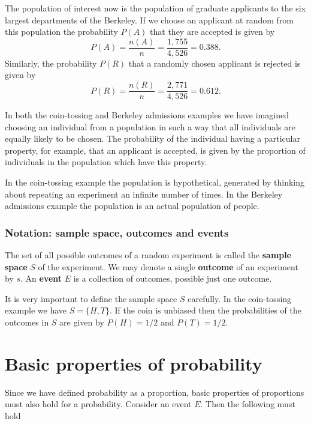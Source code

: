 \documentclass[
  british,
]{book}
\begin{document}
\FloatBarrier

The population of interest now is the population of graduate applicants to the six largest departments of the Berkeley. If we choose an applicant at random from this population the probability \(P(A)\) that they are accepted is given by
\[ P(A) = \frac{n(A)}{n} = \frac{1,755}{4,526} = 0.388.\]
Similarly, the probability \(P(R)\) that a randomly chosen applicant is rejected is given by
\[ P(R) = \frac{n(R)}{n} = \frac{2,771}{4,526} = 0.612.\]

In both the coin-tossing and Berkeley admissions examples we have imagined choosing an individual from a population in such a way that all individuals are equally likely to be chosen. The probability of the individual having a particular property, for example, that an applicant is accepted, is given by the proportion of individuals in the population which have this property.

In the coin-tossing example the population is hypothetical, generated by thinking about repeating an experiment an infinite number of times. In the Berkeley admissions example the population is an actual population of people.

\hypertarget{notation-sample-space-outcomes-and-events}{%
\subsubsection*{Notation: sample space, outcomes and events}\label{notation-sample-space-outcomes-and-events}}

The set of all possible outcomes of a random experiment is called the \textbf{sample space} \(S\) of the experiment. We may denote a single \textbf{outcome} of an experiment by \(s\). An \textbf{event} \(E\) is a collection of outcomes, possible just one outcome.

It is very important to define the sample space \(S\) carefully. In the coin-tossing example we have \(S=\{H,T\}\). If the coin is unbiased then the probabilities of the outcomes in \(S\) are given by \(P(H)=1/2\) and \(P(T)=1/2\).

\hypertarget{basic-properties-of-probability}{%
\section{Basic properties of probability}\label{basic-properties-of-probability}}

Since we have defined probability as a proportion, basic properties of proportions must also hold for a probability. Consider an event \(E\). Then the following must hold
\end{document}
